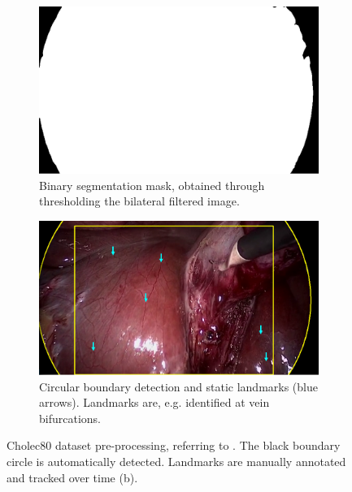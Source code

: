 \begin{figure}[tb]
\centering
\begin{subfigure}[b]{0.49\textwidth}
    \centering
    \includegraphics[width=\textwidth]{img/annotation/annotation_seg.png}
    \caption{Binary segmentation mask, obtained through thresholding the bilateral filtered image.}
    \label{c3:fig:seg_a}
\end{subfigure}
\begin{subfigure}[b]{0.49\textwidth}
    \centering
    \includegraphics[width=\textwidth]{img/annotation/annotation_real.png}
    \caption{Circular boundary detection and static landmarks (blue arrows). Landmarks are, e.g. identified at vein bifurcations.}
    \label{c3:fig:seg_b}
\end{subfigure}
\caption{Cholec80 dataset pre-processing, referring to . The black boundary circle is automatically detected. Landmarks are manually annotated and tracked over time (b).}
\label{c3:fig:seg}
\end{figure}

